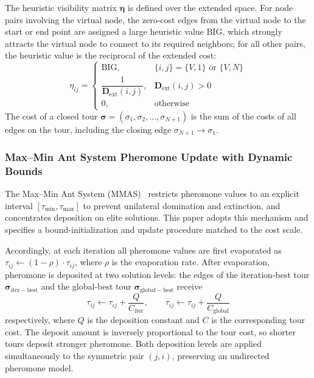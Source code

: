 The heuristic visibility matrix $\bm{\eta}$ is defined over the extended space. For node pairs involving the virtual node, the zero-cost edges from the virtual node to the start or end point are assigned a large heuristic value $\mathrm{BIG}$, which strongly attracts the virtual node to connect to its required neighbors; for all other pairs, the heuristic value is the reciprocal of the extended cost:
\begin{equation}
\eta_{ij} =
\begin{cases}
\mathrm{BIG}, & \{i, j\} = \{V, 1\} \text{ or } \{V, N\} \\
\dfrac{1}{\mathbf{D}_{\mathrm{ext}}(i,j)}, & \mathbf{D}_{\mathrm{ext}}(i,j) > 0 \\
0, & \text{otherwise}
\end{cases}
\label{eq:eta}
\end{equation}
The cost of a closed tour $\bm{\sigma} = (\sigma_1, \sigma_2, \dots, \sigma_{N+1})$ is the sum of the costs of all edges on the tour, including the closing edge $\sigma_{N+1} \to \sigma_1$.

\subsubsection{Max--Min Ant System Pheromone Update with Dynamic Bounds}

The Max--Min Ant System (MMAS)~\textcolor{blue}{\cite{ref23}} restricts pheromone values to an explicit interval $[\tau_{\min}, \tau_{\max}]$ to prevent unilateral domination and extinction, and concentrates deposition on elite solutions. This paper adopts this mechanism and specifies a bound-initialization and update procedure matched to the cost scale.

Accordingly, at each iteration all pheromone values are first evaporated as $\tau_{ij} \leftarrow (1 - \rho) \cdot \tau_{ij}$, where $\rho$ is the evaporation rate. After evaporation, pheromone is deposited at two solution levels: the edges of the iteration-best tour $\bm{\sigma}_{\mathrm{iter-best}}$ and the global-best tour $\bm{\sigma}_{\mathrm{global-best}}$ receive
\begin{equation}
\tau_{ij} \leftarrow \tau_{ij} + \frac{Q}{C_{\mathrm{iter}}}, \qquad
\tau_{ij} \leftarrow \tau_{ij} + \frac{Q}{C_{\mathrm{global}}}
\label{eq:deposit}
\end{equation}
respectively, where $Q$ is the deposition constant and $C$ is the corresponding tour cost. The deposit amount is inversely proportional to the tour cost, so shorter tours deposit stronger pheromone. Both deposition levels are applied simultaneously to the symmetric pair $(j, i)$, preserving an undirected pheromone model.

